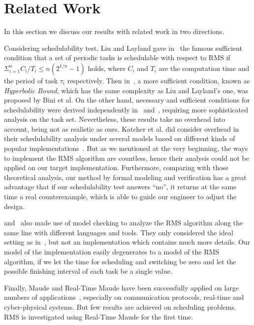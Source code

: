 \documentclass{llncs}
\begin{document}
\section{Related Work}
\label{s:relate}
In this section we discuss our results with related work in two
directions.

Considering schedulability test, Liu and Layland gave
in~\cite{DBLP:journals/jacm/LiuL73} the famous sufficient condition
that a set of periodic tasks is schedulable with respect to RMS if
$\displaystyle \Sigma^n_{i=1} C_i/T_i \le n(2^{1/n}-1)$ holds, where
$C_i$ and $T_i$ are the computation time and the period of task
$\tau_i$ respectively. Then in~\cite{DBLP:journals/tc/BiniBB03}, a
more sufficient condition, known as \emph{Hyperbolic Bound}, which has
the same complexity as Liu and Layland's one, was proposed by Bini et
al. On the other hand, necessary and sufficient conditions for
schedulability were derived independently
in~\cite{DBLP:journals/rts/SpruntSL89} and~\cite{audsley1993deadline},
requiring more sophisticated analysis on the task set. Nevertheless,
these results take no overhead into account, being not as realistic as
ours. Katcher et al. did consider overhead in their schedulability
analysis under several models based on different kinds of popular
implementations~\cite{DBLP:journals/tse/KatcherAS93}. But as we
mentioned at the very beginning, the ways to implement the RMS
algorithm are countless, hence their analysis could not be applied on
our target implementation. Furthermore, comparing with those
theoretical analysis, our method by formal modeling and verification
has a great advantage that if our schedulability test answers ``no'',
it returns at the same time a real counterexample, which is able to
guide our engineer to adjust the design.

\cite{DBLP:conf/iceccs/CuiDT14} and~\cite{TianD2011} also made use of
model checking to analyze the RMS algorithm along the same line with
different languages and tools. They only considered the ideal setting
as in~\cite{DBLP:journals/jacm/LiuL73}, but not an implementation
which contains much more details. Our model of the implementation
easily degenerates to a model of the RMS algorithm, if we let the time
for scheduling and switching be zero and let the possible finishing
interval of each task be a single value.

Finally, Maude and Real-Time Maude have been successfully applied on
large numbers of applications~\cite{DBLP:journals/jlp/Meseguer12},
especially on communication protocols, real-time and cyber-physical
systems. But few results are achieved on scheduling problems. RMS is
investigated using Real-Time Maude for the first time.
\end{document}
